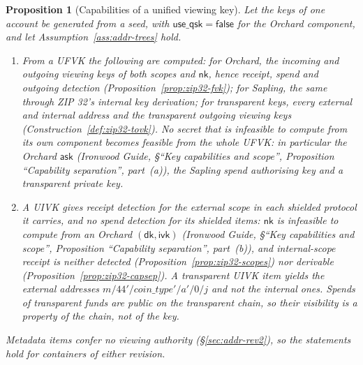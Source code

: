 \documentclass[11pt,a4paper]{article}
\newtheorem{proposition}[theorem]{Proposition}
\theoremstyle{definition}
\newcommand{\ask}{\ensuremath{\mathsf{ask}}}
\newcommand{\nksym}{\ensuremath{\mathsf{nk}}}
\newcommand{\ivk}{\ensuremath{\mathsf{ivk}}}
\newcommand{\dk}{\ensuremath{\mathsf{dk}}}
\begin{document}
\begin{proposition}[Capabilities of a unified viewing key]%
\label{prop:addr-uvk-cap}
Let the keys of one account be generated from a seed, with
$\mathsf{use\_qsk} = \mathsf{false}$ for the Orchard component, and let
Assumption~\ref{ass:addr-trees} hold.
\begin{enumerate}[label=(\alph*)]
\item From a UFVK the following are computed: for Orchard, the incoming and
  outgoing viewing keys of both scopes and $\nksym$, hence receipt, spend
  and outgoing detection (Proposition~\ref{prop:zip32-fvk}); for Sapling,
  the same through ZIP 32's internal key derivation; for transparent keys,
  every external and internal address and the transparent outgoing viewing
  keys (Construction~\ref{def:zip32-tovk}). No secret that is infeasible to
  compute from its own component becomes feasible from the whole UFVK: in
  particular the Orchard $\ask$ (\emph{Ironwood Guide}, \S``Key capabilities and
  scope'', Proposition ``Capability separation'', part~(a)), the Sapling spend
  authorising key and a transparent private key.
\item A UIVK gives receipt detection for the external scope in each
  shielded protocol it carries, and no spend detection for its shielded
  items: $\nksym$ is infeasible to compute from an Orchard $(\dk, \ivk)$
  (\emph{Ironwood Guide}, \S``Key capabilities and scope'', Proposition
  ``Capability separation'', part~(b)), and internal-scope receipt is neither
  detected (Proposition~\ref{prop:zip32-scopes}) nor derivable
  (Proposition~\ref{prop:zip32-capsep}). A transparent UIVK item yields the
  external addresses $m/44'/\mathit{coin\_type}'/a'/0/j$ and not the internal
  ones. Spends of transparent funds are public on the transparent chain, so
  their visibility is a property of the chain, not of the key.
\end{enumerate}
Metadata items confer no viewing authority (\S\ref{sec:addr-rev2}), so the
statements hold for containers of either revision.
\end{proposition}
\end{document}
